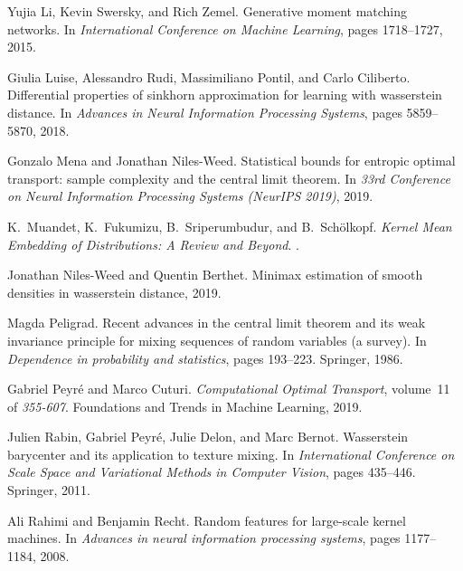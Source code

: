 \documentclass{article}
\theoremstyle{definition}
\begin{document}
\begin{thebibliography}{53}
Yujia Li, Kevin Swersky, and Rich Zemel.
\newblock Generative moment matching networks.
\newblock In \emph{International Conference on Machine Learning}, pages
  1718--1727, 2015.

Giulia Luise, Alessandro Rudi, Massimiliano Pontil, and Carlo Ciliberto.
\newblock Differential properties of sinkhorn approximation for learning with
  wasserstein distance.
\newblock In \emph{Advances in Neural Information Processing Systems}, pages
  5859--5870, 2018.

Gonzalo Mena and Jonathan Niles-Weed.
\newblock Statistical bounds for entropic optimal transport: sample complexity
  and the central limit theorem.
\newblock In \emph{33rd Conference on Neural Information Processing Systems
  (NeurIPS 2019)}, 2019.

K.~{Muandet}, K.~{Fukumizu}, B.~{Sriperumbudur}, and B.~{Schölkopf}.
\newblock \emph{Kernel Mean Embedding of Distributions: A Review and Beyond}.
.

Jonathan Niles-Weed and Quentin Berthet.
\newblock Minimax estimation of smooth densities in wasserstein distance, 2019.

Magda Peligrad.
\newblock Recent advances in the central limit theorem and its weak invariance
  principle for mixing sequences of random variables (a survey).
\newblock In \emph{Dependence in probability and statistics}, pages 193--223.
  Springer, 1986.

Gabriel Peyr\'{e} and Marco Cuturi.
\newblock \emph{Computational Optimal Transport}, volume~11 of \emph{355-607}.
\newblock Foundations and Trends in Machine Learning, 2019.

Julien Rabin, Gabriel Peyr{\'e}, Julie Delon, and Marc Bernot.
\newblock Wasserstein barycenter and its application to texture mixing.
\newblock In \emph{International Conference on Scale Space and Variational
  Methods in Computer Vision}, pages 435--446. Springer, 2011.

Ali Rahimi and Benjamin Recht.
\newblock Random features for large-scale kernel machines.
\newblock In \emph{Advances in neural information processing systems}, pages
  1177--1184, 2008.


\end{thebibliography}
\end{document}
